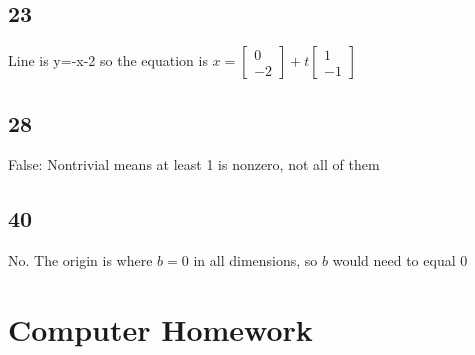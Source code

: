 \documentclass{article}
\begin{document}
\subsection*{23}
Line is y=-x-2
so the equation is $x=\begin{bmatrix}0\\-2\end{bmatrix} + t\begin{bmatrix}1 \\ -1\end{bmatrix}$
\subsection*{28}
False: Nontrivial means at least 1 is nonzero, not all of them
\subsection*{40}
No. The origin is where $b=0$ in all dimensions, so $b$ would need to equal 0

\section{Computer Homework}
\subsection{}
\subsection{}
\subsection{}
\subsection{}
\subsection{}
\subsection{}
\subsection{}
\subsection{}
\subsection{}
\subsection{}
\end{document}
